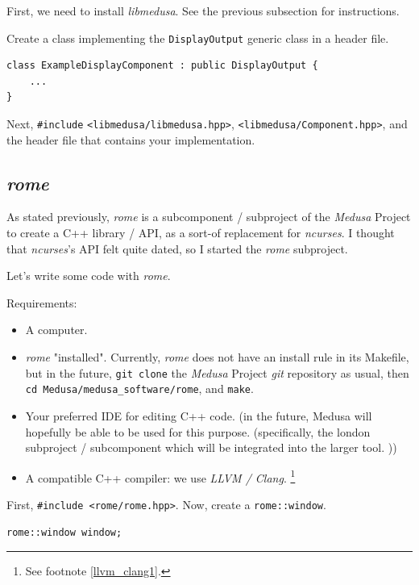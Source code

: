 \documentclass{article}
\newcommand{\Medusa}{\textit{Medusa}\xspace}
\begin{document}
	First, we need to install \textit{libmedusa}. See the previous subsection
	for instructions.

	Create a class implementing the \texttt{DisplayOutput} generic class in a
	header file.

	\begin{lstlisting}
class ExampleDisplayComponent : public DisplayOutput {
	...
}
	\end{lstlisting}

	Next, \texttt{\#include} \texttt{<libmedusa/libmedusa.hpp>},
	\texttt{<libmedusa/Component.hpp>}, and the header file that contains your
	implementation.

	\subsection{\textit{rome}}
	As stated previously, \textit{rome} is a subcomponent / subproject of the
	\Medusa Project to create a C++ library / API, as a sort-of replacement for
	\textit{ncurses}. I thought that \textit{ncurses}'s API felt quite dated, so
	I started the \textit{rome} subproject.

	Let's write some code with \textit{rome}.

	Requirements:
	\begin{itemize}
		\item A computer.
		
		\item \textit{rome} "installed". Currently, \textit{rome} does not have
		an install rule in its Makefile, but in the future, \texttt{git clone}
		the \Medusa Project \textit{git} repository as usual, then \texttt{cd
		Medusa/medusa\_software/rome}, and \texttt{make}.

		\item Your preferred IDE for editing C++ code. (in the future, Medusa
		will hopefully be able to be used for this purpose. (specifically, the
		london subproject / subcomponent which will be integrated into the
		larger tool. ))

		\item A compatible C++ compiler: we use \textit{LLVM / Clang}.
		\footnote{
			See footnote \ref{llvm_clang1}.
		}
	\end{itemize}

	First, \texttt{\#include <rome/rome.hpp>}. Now, create a
	\texttt{rome::window}.

	\begin{lstlisting}
rome::window window;
	\end{lstlisting}
\end{document}

